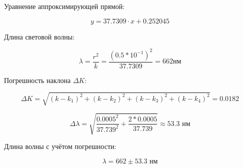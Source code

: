 \begin{landscape}
\end{landscape}

Уравнение аппроксимирующей прямой:

\[
y=37.7309 \cdot x + 0.252045
\] 

Длина световой волны:

\[
\lambda = \frac{r^2}{k} = \frac{(0.5*10^{-1})^2}{37.7309} = 662 \text{нм}
\]

Погрешность наклона $\Delta K$:

\[
\Delta K = \sqrt{(k-k_1)^2+(k-k_2)^2+(k-k_3)^2+(k-k_4)^2} = 0.0182
\]

\[
\Delta \lambda = \sqrt{\frac{0.0005^2}{37.739^2}+\frac{2*0.0005}{37.739}} \approx 53.3 \text{ нм}
\]


Длина волны с учётом погрешности:

\[
\lambda = 662 \pm 53.3 \text{ нм}
\]